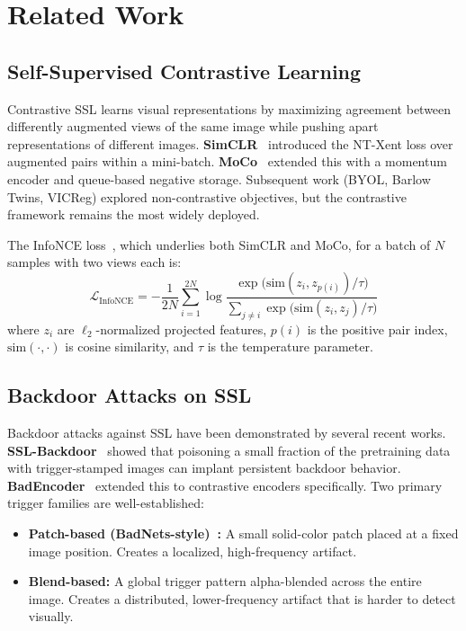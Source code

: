 \documentclass[11pt,a4paper]{article}
\begin{document}
\section{Related Work}
\label{sec:related}

\subsection{Self-Supervised Contrastive Learning}

Contrastive SSL learns visual representations by maximizing agreement between
differently augmented views of the same image while pushing apart
representations of different images.  \textbf{SimCLR}~\cite{chen2020simclr}
introduced the NT-Xent loss over augmented pairs within a mini-batch.
\textbf{MoCo}~\cite{he2020moco} extended this with a momentum encoder and
queue-based negative storage.  Subsequent work (BYOL, Barlow Twins, VICReg)
explored non-contrastive objectives, but the contrastive framework remains the
most widely deployed.

The InfoNCE loss~\cite{oord2018cpc}, which underlies both SimCLR and MoCo, for a
batch of $N$ samples with two views each is:
\begin{equation}
  \mathcal{L}_{\text{InfoNCE}}
  = -\frac{1}{2N}\sum_{i=1}^{2N}
    \log\frac{\exp\bigl(\text{sim}(z_i, z_{p(i)})/\tau\bigr)}
             {\sum_{j\neq i}\exp\bigl(\text{sim}(z_i, z_j)/\tau\bigr)}
  \label{eq:infonce}
\end{equation}
where $z_i$ are $\ell_2$-normalized projected features, $p(i)$ is the positive
pair index, $\text{sim}(\cdot,\cdot)$ is cosine similarity, and $\tau$ is the
temperature parameter.

\subsection{Backdoor Attacks on SSL}

Backdoor attacks against SSL have been demonstrated by several recent works.
\textbf{SSL-Backdoor}~\cite{saha2022backdoor} showed that poisoning a small
fraction of the pretraining data with trigger-stamped images can implant
persistent backdoor behavior.  \textbf{BadEncoder}~\cite{jia2022badencoder}
extended this to contrastive encoders specifically.  Two primary trigger families
are well-established:

\begin{itemize}[nosep]
  \item \textbf{Patch-based (BadNets-style)~\cite{gu2017badnets}:} A small
    solid-color patch placed at a fixed image position.  Creates a localized,
    high-frequency artifact.
  \item \textbf{Blend-based:} A global trigger pattern alpha-blended across the
    entire image.  Creates a distributed, lower-frequency artifact that is
    harder to detect visually.
\end{itemize}
\end{document}
